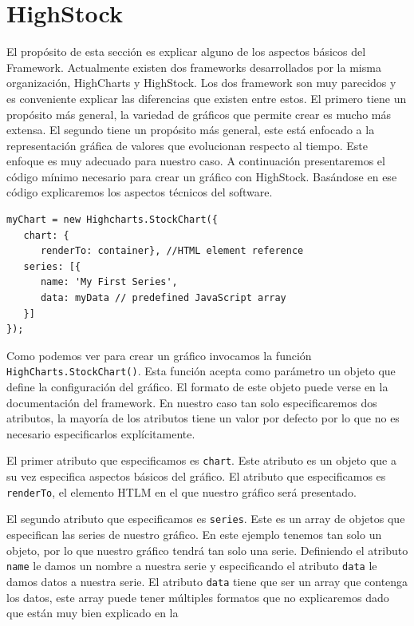 \section{HighStock}
	El propósito de esta sección es explicar alguno de los aspectos básicos del Framework. Actualmente existen dos frameworks desarrollados por la
	misma organización, HighCharts y HighStock. Los dos framework son muy parecidos y es conveniente explicar las diferencias que existen entre
	estos. El primero tiene un propósito más general, la variedad de gráficos que permite crear es mucho más extensa. El segundo tiene un
	propósito más general, este está enfocado a la representación gráfica de valores que evolucionan respecto al tiempo. Este enfoque es muy
	adecuado para nuestro caso. A continuación presentaremos el código mínimo necesario para crear un gráfico con HighStock. Basándose en ese
	código explicaremos los aspectos técnicos del software.
	\begin{lstlisting}
myChart = new Highcharts.StockChart({
   chart: {
      renderTo: container}, //HTML element reference
   series: [{
      name: 'My First Series',
      data: myData // predefined JavaScript array
   }]
});
	\end{lstlisting}
	Como podemos ver para crear un gráfico invocamos la función \texttt{HighCharts.StockChart()}. Esta función acepta como parámetro un objeto que
	define la configuración del gráfico. El formato de este objeto puede verse en la documentación del framework\cite{HighStockDoc}. En nuestro
	caso tan solo especificaremos dos atributos, la mayoría de los atributos tiene un valor por defecto por lo que no es necesario especificarlos
	explícitamente. 
	\par
	El primer atributo que especificamos es \texttt{chart}. Este atributo es un objeto que a su vez especifica  aspectos básicos del gráfico. El
	atributo que especificamos es \texttt{renderTo}, el elemento HTLM en el que nuestro gráfico será presentado.
	\par
	El segundo atributo que especificamos es \texttt{series}. Este es un array de objetos que especifican las series de nuestro gráfico. En este
	ejemplo tenemos tan solo un objeto, por lo que nuestro gráfico tendrá tan solo una serie.  Definiendo el atributo \texttt{name} le damos un
	nombre a nuestra serie y especificando el atributo \texttt{data} le damos datos a nuestra serie. El atributo \texttt{data} tiene que ser un
	array que contenga los datos, este array puede tener múltiples formatos que no explicaremos dado que están muy bien explicado en la

